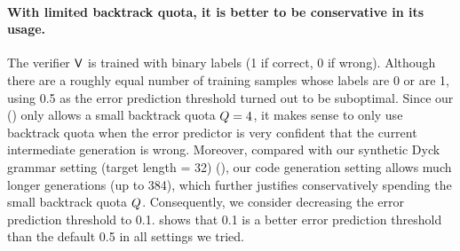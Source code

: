 \paragraph{With limited backtrack quota, it is better to be conservative in its usage.}
The verifier $\mathsf{V}$ is trained with binary labels
(1 if correct, 0 if wrong).
Although there are a roughly equal number of training samples whose labels are 0 or are 1,
using 0.5 as the error prediction threshold turned out to be suboptimal.
Since our \algoName () 
only allows a small backtrack quota $Q = 4$,
it makes sense to only use backtrack quota when the error predictor is very confident that the current intermediate generation is wrong.
Moreover, compared with our synthetic Dyck grammar setting (target length = 32) (),
our code generation setting allows much longer generations (up to 384),
which further justifies conservatively spending the small backtrack quota $Q$.
Consequently, we consider decreasing the error prediction threshold to 0.1.
 shows that 0.1 is a better error prediction threshold than the default 0.5 in all settings we tried.



